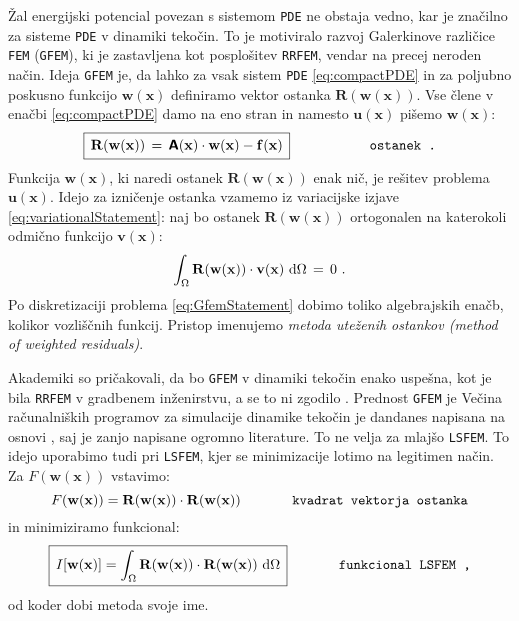 Žal energijski potencial povezan s sistemom \texttt{PDE} ne obstaja vedno, kar je značilno za sisteme \texttt{PDE} v dinamiki tekočin. To je motiviralo razvoj Galerkinove različice \texttt{FEM} (\texttt{GFEM}), ki je zastavljena kot posplošitev \texttt{RRFEM}, vendar na precej neroden način. Ideja \texttt{GFEM} je, da lahko za vsak sistem \texttt{PDE} \eqref{eq:compactPDE} in za poljubno poskusno funkcijo $\mathbf{w(x)}$ definiramo vektor ostanka $\mathbf{R(w(x))}$. Vse člene v enačbi \eqref{eq:compactPDE} damo na eno stran in namesto $\mathbf{u(x)}$ pišemo $\mathbf{w(x)}$:
\begin{equation}
	\hspace{0mm} \boxed{\, \vphantom{\big(}
		\mathbf{R(w(x))} \, = \, \mathbsf{A}(\mathbf{x}) \cdot \mathbf{w(x)} - \mathbf{f(x)} \,
	}\hspace{20mm} \texttt{ostanek .}
	\label{eq:residual}
\end{equation}
Funkcija $\mathbf{w(x)}$, ki naredi ostanek $\mathbf{R(w(x))}$ enak nič, je rešitev problema $\mathbf{u(x)}$. Idejo za izničenje ostanka vzamemo iz variacijske izjave \eqref{eq:variationalStatement}: naj bo ostanek $\mathbf{R(w(x))}$ ortogonalen na katerokoli odmično funkcijo $\mathbf{v(x)}$:
\begin{equation}
	\int_{\Omega} \mathbf{R(w(x))} \cdot \mathbf{v(x)} \ \mathrm{d} \Omega \, = \, 0 \ .
	\label{eq:GfemStatement}
\end{equation}
Po diskretizaciji problema \eqref{eq:GfemStatement} dobimo toliko algebrajskih enačb, kolikor vozliščnih funkcij. Pristop imenujemo \emph{metoda uteženih ostankov (method of weighted residuals)}.

Akademiki so pričakovali, da bo \texttt{GFEM} v dinamiki tekočin enako uspešna, kot je bila \texttt{RRFEM} v gradbenem inženirstvu, a se to ni zgodilo \cite{JiangB-LSFEM}. Prednost \texttt{GFEM} je Večina računalniških programov za simulacije dinamike tekočin je dandanes napisana na osnovi , saj je zanjo napisane ogromno literature. To ne velja za mlajšo \texttt{LSFEM}.  To idejo uporabimo tudi pri \texttt{LSFEM}, kjer se minimizacije lotimo na legitimen način. Za $F(\mathbf{w(x)})$ vstavimo:
\begin{equation}
	F(\mathbf{w(x)}) = \mathbf{R(w(x))} \cdot \mathbf{R(w(x))} \hspace{1.3cm} \texttt{kvadrat vektorja ostanka}
\end{equation}
in minimiziramo funkcional:
\begin{equation}
	\boxed{\, I[\mathbf{w(x)}] = \int_{\Omega} \mathbf{R(w(x))} \cdot \mathbf{R(w(x))} \ \mathrm{d} \Omega \,} \hspace{1.3cm} \texttt{funkcional LSFEM ,}
\end{equation}
od koder dobi metoda svoje ime.


